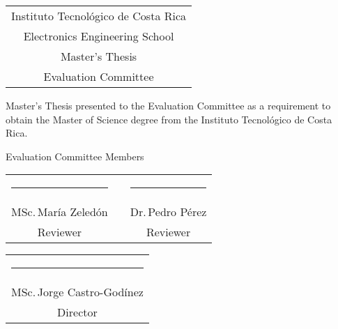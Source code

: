 
\thispagestyle{empty}

\newcommand{\lectorI}{MSc.\,María Zeledón}
\newcommand{\lectorII}{Dr.\,Pedro Pérez}
\newcommand{\director}{MSc.\,Jorge Castro-Godínez}


\begin{center}
  \begin{tabular}{c}
    Instituto Tecnológico de Costa Rica \\
    Electronics Engineering School \\
    Master's Thesis \\
    Evaluation Committee
  \end{tabular}
\end{center}

\vfill

Master's Thesis presented to the Evaluation Committee as a requirement to
obtain the Master of Science degree from the Instituto Tecnológico de Costa 
Rica.


\vfill

\vspace*{20mm}
\begin{center}
 Evaluation Committee Members
\end{center}
\vspace*{8mm}

\vfill

\begin{center}
   \begin{tabular}{ccc}
     \rule{70mm}{0.5pt} & \rule{15mm}{0pt} & \rule{70mm}{0.5pt} \\
     \lectorI && \lectorII \\
     Reviewer && Reviewer
   \end{tabular}
   
   \vspace{10mm}
 
   \begin{tabular}{c}
     \rule{6cm}{0.5pt} \\
     \director \\
     Director
   \end{tabular}
\end{center}

